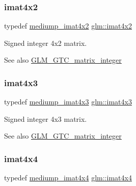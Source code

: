 \subsubsection{\texorpdfstring{imat4x2}{imat4x2}}
{\footnotesize\ttfamily typedef \mbox{\hyperlink{group__gtc__matrix__integer_ga536fe339834f7e764672c22c63ec543b}{mediump\+\_\+imat4x2}} \mbox{\hyperlink{group__gtc__matrix__integer_ga7e733984837e0e7aa9f4aac18f632f63}{glm\+::imat4x2}}}

Signed integer 4x2 matrix. \begin{DoxySeeAlso}{See also}
\mbox{\hyperlink{group__gtc__matrix__integer}{G\+L\+M\+\_\+\+G\+T\+C\+\_\+matrix\+\_\+integer}} 
\end{DoxySeeAlso}
\mbox{\label{group__gtc__matrix__integer_gaa4cca8e80c0603239eda452860063844}} 
\subsubsection{\texorpdfstring{imat4x3}{imat4x3}}
{\footnotesize\ttfamily typedef \mbox{\hyperlink{group__gtc__matrix__integer_ga213644b63e6ee8ac783fd9a75e3c5abb}{mediump\+\_\+imat4x3}} \mbox{\hyperlink{group__gtc__matrix__integer_gaa4cca8e80c0603239eda452860063844}{glm\+::imat4x3}}}

Signed integer 4x3 matrix. \begin{DoxySeeAlso}{See also}
\mbox{\hyperlink{group__gtc__matrix__integer}{G\+L\+M\+\_\+\+G\+T\+C\+\_\+matrix\+\_\+integer}} 
\end{DoxySeeAlso}
\mbox{\label{group__gtc__matrix__integer_ga367d8d5281ff82f1215a227dd2ea5ba9}} 
\subsubsection{\texorpdfstring{imat4x4}{imat4x4}}
{\footnotesize\ttfamily typedef \mbox{\hyperlink{group__gtc__matrix__integer_gaf45ac606a3fb21f46228524d1d322eb2}{mediump\+\_\+imat4x4}} \mbox{\hyperlink{group__gtc__matrix__integer_ga367d8d5281ff82f1215a227dd2ea5ba9}{glm\+::imat4x4}}}

